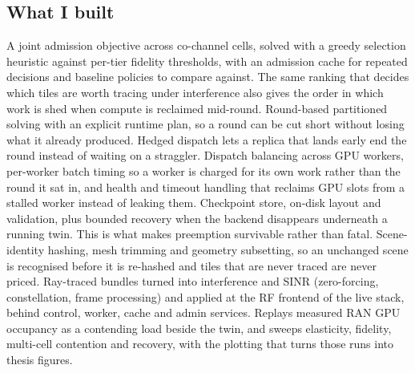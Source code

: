 \documentclass[letterpaper,11pt]{article}
\begin{document}
\vspace{2pt}
\subsection*{What I built}

\begin{itemize}[leftmargin=*]
    {A joint admission objective across co-channel cells, solved with a greedy selection heuristic against per-tier fidelity thresholds, with an admission cache for repeated decisions and baseline policies to compare against. The same ranking that decides which tiles are worth tracing under interference also gives the order in which work is shed when compute is reclaimed mid-round.}
    {Round-based partitioned solving with an explicit runtime plan, so a round can be cut short without losing what it already produced. Hedged dispatch lets a replica that lands early end the round instead of waiting on a straggler.}
    {Dispatch balancing across GPU workers, per-worker batch timing so a worker is charged for its own work rather than the round it sat in, and health and timeout handling that reclaims GPU slots from a stalled worker instead of leaking them.}
    {Checkpoint store, on-disk layout and validation, plus bounded recovery when the backend disappears underneath a running twin. This is what makes preemption survivable rather than fatal.}
    {Scene-identity hashing, mesh trimming and geometry subsetting, so an unchanged scene is recognised before it is re-hashed and tiles that are never traced are never priced.}
    {Ray-traced bundles turned into interference and SINR (zero-forcing, constellation, frame processing) and applied at the RF frontend of the live stack, behind control, worker, cache and admin services.}
    {Replays measured RAN GPU occupancy as a contending load beside the twin, and sweeps elasticity, fidelity, multi-cell contention and recovery, with the plotting that turns those runs into thesis figures.}
\end{itemize}
\end{document}
